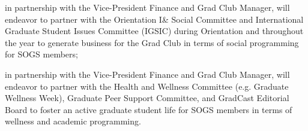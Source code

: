 \begin{longenum}[ label*=\thesubsection.\arabic*., align=left]
\begin{longenum}[ label*=\arabic*., align=left]
\begin{longenum}[ label*=\arabic*., align=left]
		\end{longenum}
	\item in partnership with the Vice-President Finance and Grad Club Manager, will endeavor to partner with the Orientation I\& Social Committee and International Graduate Student Issues Committee (IGSIC) during Orientation and throughout the year to generate business for the Grad Club in terms of social programming for SOGS members;
	\item in partnership with the Vice-President Finance and Grad Club Manager, will endeavor to partner with the Health and Wellness Committee (e.g. Graduate Wellness Week), Graduate Peer Support Committee, and GradCast Editorial Board to foster an active graduate student life for SOGS members in terms of wellness and academic programming.
	\end{longenum}
\end{longenum}